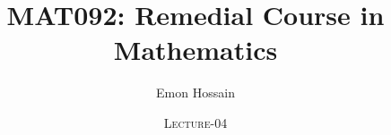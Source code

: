 \documentclass[11pt]{beamer}
\author[] %
{Emon Hossain\inst{1}}
\institute[University of Dhaka] %
{
  \inst{1}%
  Lecturer\\MNS department\\Brac University
}
\date[] %
{\textsc{Lecture-04}}
\title[]{MAT092: Remedial Course in Mathematics}
\theoremstyle{plain}
\begin{document}
\begin{frame}
\titlepage
\end{frame}













\end{document}
